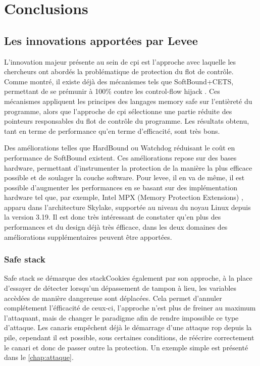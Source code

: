 \chapter{Conclusions}
\label{chap:conclusions}

\section{Les innovations apportées par Levee}

L'innovation majeur présente au sein de \gls{cpi} est l'approche avec laquelle
les chercheurs ont abordés la problématique de protection du flot de contrôle.
Comme montré, il existe déjà des mécanismes tels que SoftBound+CETS,
permettant de se prémunir à 100\% contre les \og control-flow hijack \fg.
Ces mécanismes appliquent les principes des langages \og memory safe \fg sur
l'entièreté du programme, alors que l'approche de \gls{cpi} sélectionne une
partie réduite des pointeurs responsables du flot de contrôle du programme.
Les résultats obtenu, tant en terme de performance qu'en terme d'efficacité,
sont très bons.

Des améliorations telles que HardBound ou Watchdog réduisant le coût en
performance de SoftBound existent. Ces améliorations repose sur des bases
hardware, permettant d'instrumenter la protection de la manière la plus efficace
possible et de soulager la couche software. Pour \gls{levee}, il en va de même,
il est possible d'augmenter les performances en se basant sur des implémentation
hardware tel que, par exemple, Intel MPX (Memory Protection Extensions)
\cite{IntelMPX}, apparu dans l'architecture Skylake, supportée au niveau
du noyau Linux depuis la version 3.19. Il est donc très intéressant de constater
qu'en plus des performances et du design déjà très éfficace, dans les deux domaines
des améliorations supplémentaires peuvent être apportées.

\subsection{\og Safe stack \fg}

\og Safe stack \fg se démarque des \og \gls{stackCookies} \fg également par
son approche, à la place d'essayer de détecter lorsqu'un dépassement de tampon à lieu,
les variables accèdées de manière dangereuse sont déplacées.
Cela permet d'annuler complétement l'éfficacité de ceux-ci, l'approche n'est plus de
freiner au maximum l'attaquant, mais de changer le paradigme afin de rendre impossible
ce type d'attaque.
Les canaris empêchent déjà le démarrage d'une attaque \gls{rop} depuis
la pile, cependant il est possible, sous certaines conditions, de réécrire correctement
le canari et donc de passer outre la protection. Un exemple simple est présenté dans
le \autoref{chap:attaque}.

